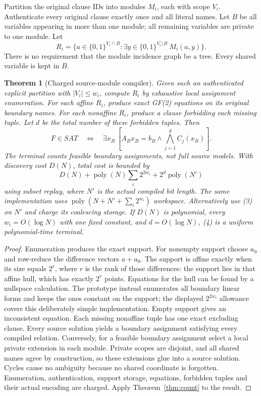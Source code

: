 \documentclass[11pt]{article}
\newtheorem{theorem}{Theorem}
\begin{document}
Partition the original clause IDs into modules $M_i$, each with scope $V_i$.
Authenticate every original clause exactly once and all literal names.
Let $B$ be all variables appearing in more than one module; all remaining
variables are private to one module. Let
\[
 R_i=\{a\in\{0,1\}^{V_i\cap B}:
           \exists y\in\{0,1\}^{V_i\setminus B}\ M_i(a,y)\}.
\]
There is no requirement that the module incidence graph be a tree.
Every shared variable is kept in $B$.

\begin{theorem}[Charged source-module compiler]\label{thm:modules}
Given such an authenticated explicit partition with $|V_i|\le w_i$, compute
$R_i$ by exhaustive local assignment enumeration. For each affine $R_i$,
produce exact GF(2) equations on its original boundary names. For each
nonaffine $R_i$, produce a clause forbidding each missing tuple.
Let $d$ be the total number of these forbidden tuples. Then
\[
 F\in SAT\quad\Longleftrightarrow\quad
 \exists x_B\ [A_Bx_B=b_B\land\bigwedge_{j=1}^d C_j(x_B)].       \tag{4}
\]
The terminal counts feasible \emph{boundary assignments}, not full source
models. With discovery cost $D(N)$, total cost is bounded by
\[
 D(N)+\operatorname{poly}(N)\sum_i2^{2w_i}
       +2^d\operatorname{poly}(N')                            \tag{5}
\]
using subset replay, where $N'$ is the actual compiled bit length.
The same implementation uses
$\operatorname{poly}(N+N'+\sum_i2^{w_i})$ workspace.
Alternatively use (3) on $N'$ and charge its coalescing storage.
If $D(N)$ is polynomial, every $w_i=O(\log N)$ with one fixed constant,
and $d=O(\log N)$, (4) is a uniform polynomial-time terminal.
\end{theorem}
\begin{proof}
Enumeration produces the exact support. For nonempty support choose $a_0$
and row-reduce the difference vectors $a+a_0$. The support is affine exactly
when its size equals $2^r$, where $r$ is the rank of those differences:
the support lies in that affine hull, which has exactly $2^r$ points.
Equations for the hull can be found by a nullspace calculation.
The prototype instead enumerates all boundary linear forms and keeps the
ones constant on the support; the displayed $2^{2w_i}$ allowance covers
this deliberately simple implementation. Empty support gives an inconsistent
equation. Each missing nonaffine tuple has one exact excluding clause.
Every source solution yields a boundary assignment satisfying every compiled
relation. Conversely, for a feasible boundary assignment select a local private
extension in each module. Private scopes are disjoint, and all shared names
agree by construction, so these extensions glue into a source solution.
Cycles cause no ambiguity because no shared coordinate is forgotten.
Enumeration, authentication, support storage, equations, forbidden tuples and
their actual encoding are charged. Apply Theorem~\ref{thm:count} to the result.
\end{proof}
\end{document}
